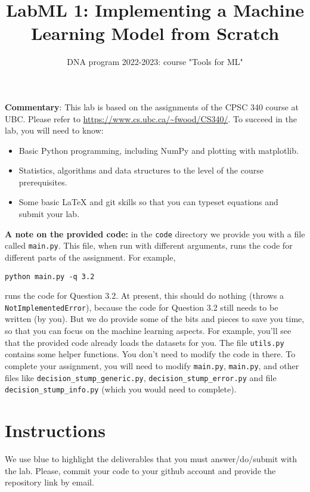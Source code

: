 \documentclass{article}
\def\blu#1{{\color{blu}#1}}
\begin{document}
\title{LabML 1: Implementing a Machine Learning Model from Scratch}
\author{DNA program 2022-2023: course "Tools for ML"}


\date{}
\maketitle



\textbf{Commentary}: 
This lab is based on the assignments of the CPSC 340 course at UBC. Please refer to \url{https://www.cs.ubc.ca/~fwood/CS340/}.
To succeed in the lab, you will need to know:
\begin{itemize}
\item Basic Python programming, including NumPy and plotting with matplotlib.
\item Statistics, algorithms and data structures to the level of the course prerequisites.
\item Some basic LaTeX and git skills so that you can typeset equations and submit your lab.
\end{itemize}
  

\textbf{A note on the provided code:} in the \texttt{code} directory we provide you with a file called
\texttt{main.py}. This file, when run with different arguments, runs the code for different
parts of the assignment. For example,
\begin{verbatim}
python main.py -q 3.2
\end{verbatim}
runs the code for Question 3.2. At present, this should do nothing (throws a \texttt{NotImplementedError}), because the code
for Question 3.2 still needs to be written (by you). But we do provide some of the bits
and pieces to save you time, so that you can focus on the machine learning aspects.
For example, you'll see that the provided code already loads the datasets for you.
The file \texttt{utils.py} contains some helper functions.
You don't need to modify the code in there.
To complete your assignment, you will need to modify \texttt{main.py}, \texttt{main.py}, and other files like \texttt{decision\_stump\_generic.py},  
\texttt{decision\_stump\_error.py} and file \texttt{decision\_stump\_info.py}  (which you would need to complete).


\section*{Instructions}

We use \blu{blue} to highlight the deliverables that you must answer/do/submit with the lab. Please, commit your code 
to your github account and provide the repository link by email.
\end{document}

